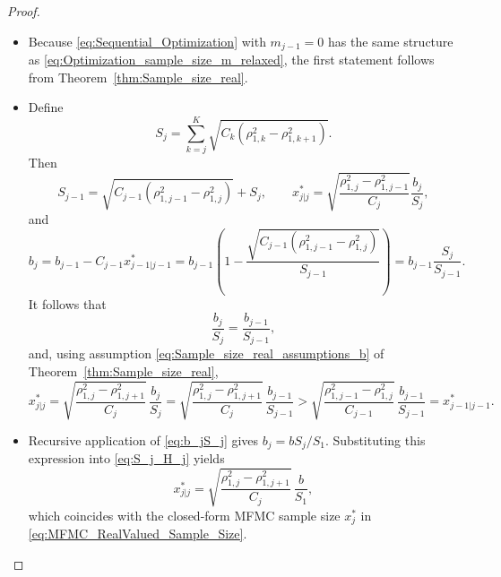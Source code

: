 \begin{proof}
 \begin{itemize}
   \item[i.] Because  \eqref{eq:Sequential_Optimization} with $m_{j-1} = 0$ has the same structure as 
                \eqref{eq:Optimization_sample_size_m_relaxed}, the first statement follows from
                Theorem~\ref{thm:Sample_size_real}.
  \item[ii.] Define
        \begin{equation}\label{eq:aggregate_cost_variance_weight_S_j}
            S_j = \sum_{k=j}^K\sqrt{C_k (\rho_{1,k}^2 - \rho_{1,k+1}^2) }.
        \end{equation}
        Then 
        \begin{equation}\label{eq:S_j_H_j}
            S_{j-1}=\sqrt{C_{j-1} (\rho_{1,j-1}^2 - \rho_{1,j}^2) }+S_j, \qquad 
            x_{j|j}^* = \sqrt{\frac{\rho_{1,j}^2 - \rho_{1,j-1}^2}{C_j}}\frac{b_j}{S_j},
        \end{equation}
        and
        \begin{equation*}
                     b_j = b_{j-1} - C_{j-1} x_{j-1|j-1}^* 
                         = b_{j-1}\left(1 - \frac{\sqrt{C_{j-1}(\rho_{1,j-1}^2 - \rho_{1,j}^2) }}{S_{j-1}}\right) 
                         = b_{j-1}\frac{S_j}{S_{j-1}}.
        \end{equation*}
        It follows that 
        \begin{equation}\label{eq:b_jS_j}
            \frac{b_j}{S_j} = \frac{b_{j-1}}{S_{j-1}},
        \end{equation}
        and, using assumption \eqref{eq:Sample_size_real_assumptions_b}
        of Theorem~\ref{thm:Sample_size_real},
        \[
             x_{j|j}^* = \sqrt{\frac{\rho_{1,j}^2 - \rho_{1,j+1}^2}{C_j}} \, \frac{b_j}{S_j}
                           = \sqrt{\frac{\rho_{1,j}^2 - \rho_{1,j+1}^2}{C_j}} \,  \frac{b_{j-1}}{S_{j-1}}
                            > \sqrt{\frac{\rho_{1,j-1}^2 - \rho_{1,j}^2}{C_{j-1}}} \, \frac{b_{j-1}}{S_{j-1}}
                           = x_{j-1|j-1}^*.
        \]
        
      \item[iii.]     Recursive application of  \eqref{eq:b_jS_j} gives $b_j = b S_j / S_1$.
             Substituting this expression into \eqref{eq:S_j_H_j} yields
             \[
                        x_{j|j}^*   = \sqrt{\frac{\rho_{1,j}^2 - \rho_{1,j+1}^2}{C_j}} \, \frac{b}{S_1},
             \]
             which coincides with the closed-form MFMC sample size $x_j^*$ in \eqref{eq:MFMC_RealValued_Sample_Size}.  
  \end{itemize}
\end{proof}

